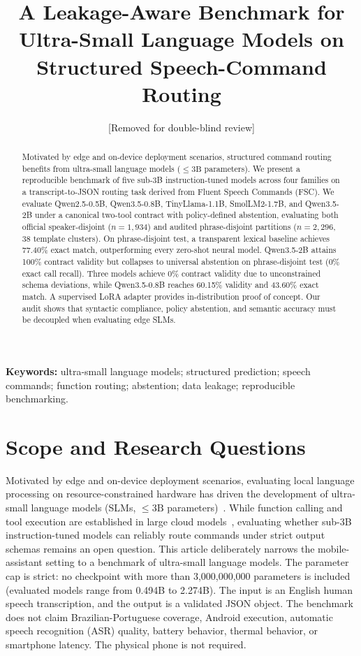 \documentclass[12pt]{article}
\title{A Leakage-Aware Benchmark for Ultra-Small Language Models on\\
Structured Speech-Command Routing}
\author{[Removed for double-blind review]}
\begin{document}
\maketitle

\begin{abstract}\sloppy
Motivated by edge and on-device deployment scenarios, structured command routing benefits from ultra-small language models ($\le 3\text{B}$ parameters). We present a reproducible benchmark of five sub-3B instruction-tuned models across four families on a transcript-to-JSON routing task derived from Fluent Speech Commands (FSC). We evaluate Qwen2.5-0.5B, Qwen3.5-0.8B, TinyLlama-1.1B, SmolLM2-1.7B, and Qwen3.5-2B under a canonical two-tool contract with policy-defined abstention, evaluating both official speaker-disjoint ($n=1{,}934$) and audited phrase-disjoint partitions ($n=2{,}296$, 38 template clusters). On phrase-disjoint test, a transparent lexical baseline achieves 77.40\% exact match, outperforming every zero-shot neural model. Qwen3.5-2B attains 100\% contract validity but collapses to universal abstention on phrase-disjoint test (0\% exact call recall). Three models achieve 0\% contract validity due to unconstrained schema deviations, while Qwen3.5-0.8B reaches 60.15\% validity and 43.60\% exact match. A supervised LoRA adapter provides in-distribution proof of concept. Our audit shows that syntactic compliance, policy abstention, and semantic accuracy must be decoupled when evaluating edge SLMs.
\end{abstract}

\noindent\textbf{Keywords:} ultra-small language models; structured prediction; speech commands; function routing; abstention; data leakage; reproducible benchmarking.

\section{Scope and Research Questions}

Motivated by edge and on-device deployment scenarios, evaluating local language processing on resource-constrained hardware has driven the development of ultra-small language models (SLMs, $\le 3\text{B}$ parameters)~\cite{liu2024mobilellm, abdin2024phi3}. While function calling and tool execution are established in large cloud models~\cite{schick2023toolformer, patil2025bfcl}, evaluating whether sub-3B instruction-tuned models can reliably route commands under strict output schemas remains an open question. This article deliberately narrows the mobile-assistant setting to a benchmark of ultra-small language models. The parameter cap is strict: no checkpoint with more than 3,000,000,000 parameters is included (evaluated models range from 0.494B to 2.274B). The input is an English human speech transcription, and the output is a validated JSON object. The benchmark does not claim Brazilian-Portuguese coverage, Android execution, automatic speech recognition (ASR) quality, battery behavior, thermal behavior, or smartphone latency. The physical phone is not required.
\end{document}
